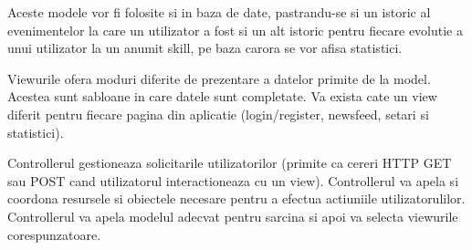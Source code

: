 \documentclass{article}
\begin{document}
Aceste modele vor fi folosite si in baza de date, pastrandu-se si un istoric al evenimentelor la care un utilizator a fost si un alt istoric pentru fiecare evolutie a unui utilizator la un anumit skill, pe baza carora se vor afisa statistici.

Viewurile ofera moduri diferite de prezentare a datelor primite de la model. Acestea sunt sabloane in care datele sunt completate. Va exista cate un view diferit pentru fiecare pagina din aplicatie (login/register, newsfeed, setari si statistici).

Controllerul gestioneaza solicitarile utilizatorilor (primite ca cereri HTTP GET sau POST cand utilizatorul interactioneaza cu un view). Controllerul va apela si coordona resursele si obiectele necesare pentru a efectua actiuniile utilizatorulilor. Controllerul va apela modelul adecvat pentru sarcina si apoi va selecta viewurile corespunzatoare.
\end{document}
